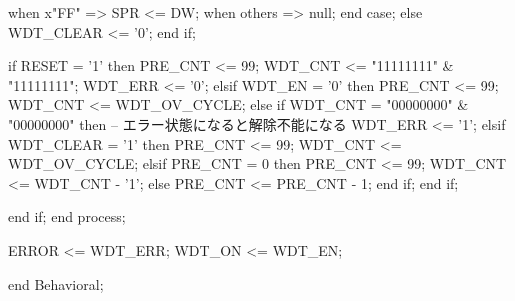 \begin{mylisting}[language=VHDL,caption=WDTモジュール,label=appF_WDT_module_VHDL]
					when x"FF"	=>	SPR			<= DW;
					when others		=> null;
				end case;
			else
				WDT_CLEAR <= '0';
			end if;
			
			
			if RESET = '1' then
				PRE_CNT		<= 99;
				WDT_CNT		<= "11111111" & "11111111";
				WDT_ERR		<= '0';
			elsif WDT_EN = '0' then
				PRE_CNT		<= 99;
				WDT_CNT		<= WDT_OV_CYCLE;
			else
				if WDT_CNT = "00000000" & "00000000" then						-- エラー状態になると解除不能になる
					WDT_ERR		<= '1';
				elsif WDT_CLEAR = '1' then
					PRE_CNT		<= 99;
					WDT_CNT		<= WDT_OV_CYCLE;
				elsif PRE_CNT = 0 then
					PRE_CNT		<= 99;
					WDT_CNT		<= WDT_CNT - '1';
				else
					PRE_CNT	<= PRE_CNT - 1;
				end if;
			end if;
			
			
			
		end if;
	end process;
	
	ERROR	<= WDT_ERR;
	WDT_ON	<= WDT_EN;


end Behavioral;



\end{mylisting}